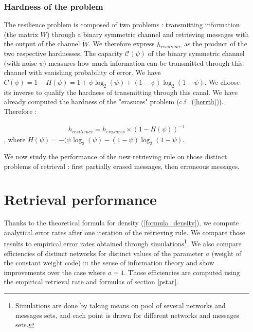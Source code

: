 \documentclass[english,10pt,twocolumn]{IEEEtran}
\theoremstyle{definition}
\begin{document}
			
	\subsubsection{Hardness of the problem}
	
	The resilience problem is composed of two problems : transmitting information (the matrix $W$) through a binary symmetric channel and retrieving messages with the output of the channel $\tilde{W}$. We therefore express $h_{resilience}$ as the product of the two respective hardnesses. The capacity $\mathcal{C}(\psi)$ of the binary symmetric channel (with noise $\psi$) measures how much information can be transmitted through this channel with vanishing probability of error. We have $C(\psi) = 1 - H(\psi) = 1 + \psi \log_2 (\psi) + (1-\psi) \log_2 (1-\psi)$. We choose its inverse to qualify the hardness of transmitting through this canal. We have already computed the hardness of the "erasures" problem (c.f.~(\ref{herrth})). Therefore :
	
	\begin{align}
		h_{resilience} = h_{erasures} \times \left( 1 - H(\psi) \right)^{-1}
	\end{align}	
	, where $H(\psi) = -(\psi \log_2 (\psi) - (1-\psi) \log_2 (1-\psi)$.
	
	\vspace*{1mm}We now study the performance of the new retrieving rule on those distinct problems of retrieval : first partially erased messages, then erroneous messages.%
		
	\section{Retrieval performance}	
	
	Thanks to the theoretical formula for density (\ref{formula_density}), we compute analytical error rates after one iteration of the retrieving rule. We compare those results to empirical error rates obtained through simulations\footnote{Simulations are done by taking means on pool of several networks and messages sets, and each point is drawn for different networks and messages sets.}. We also compare efficiencies of distinct networks for distinct values of the parameter $a$ (weight of the constant weight code) in the sense of information theory and show improvements over the case where $a = 1$. Those efficiencies are computed using the empirical retrieval rate and formulas of section \ref{pstat}.
	
\end{document}
